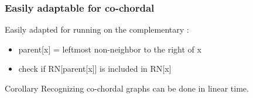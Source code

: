 \documentclass{beamer}
\begin{document}
\begin{frame}[fragile]\frametitle{Easily adaptable for co-chordal}
    Easily adapted for running on the complementary :
	\begin{itemize}
	     \item parent[x] = leftmost non-neighbor to the right of x
             \item check if RN[parent[x]] is included in RN[x]
	\end{itemize}

    \begin{block}{Corollary}
	Recognizing co-chordal graphs can be done in linear time.
    \end{block}
\end{frame}
\end{document}
